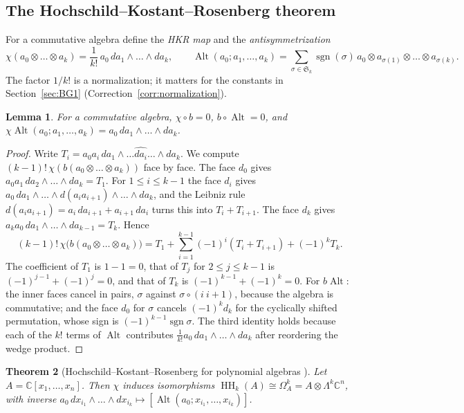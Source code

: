 \documentclass[11pt,oneside,reqno]{article}
\DeclareMathOperator{\HH}{HH}
\DeclareMathOperator{\sgn}{sgn}
\newcommand{\C}{\mathbb C}
\newcommand{\Om}{\Omega}
\theoremstyle{plain}
\newtheorem{theorem}{Theorem}[section]
\newtheorem{lemma}[theorem]{Lemma}
\theoremstyle{definition}
\theoremstyle{remark}
\begin{document}
\subsection{The Hochschild--Kostant--Rosenberg theorem}\label{subsec:HKR}
For a commutative algebra define the \emph{HKR map} and the
\emph{antisymmetrization}
\begin{equation}\label{eq:HKR}
 \chi(a_0\otimes\dots\otimes a_k)=\frac1{k!}\,a_0\,da_1\wedge\dots\wedge da_k,
 \qquad
 \operatorname{Alt}(a_0;a_1,\dots,a_k)=\sum_{\sigma\in\mathfrak S_k}\sgn(\sigma)\,
 a_0\otimes a_{\sigma(1)}\otimes\dots\otimes a_{\sigma(k)} .
\end{equation}
The factor \(1/k!\) is a normalization; it matters for the constants in
Section~\ref{sec:BG1} (Correction~\ref{corr:normalization}).

\begin{lemma}\label{lem:chi}
For a commutative algebra, \(\chi\circ b=0\), \(b\circ\operatorname{Alt}=0\), and
\(\chi\operatorname{Alt}(a_0;a_1,\dots,a_k)=a_0\,da_1\wedge\dots\wedge da_k\).
\end{lemma}

\begin{proof}
Write \(T_i=a_0a_i\,da_1\wedge\dots\widehat{da_i}\dots\wedge da_k\). We
compute \((k-1)!\,\chi(b(a_0\otimes\dots\otimes a_k))\) face by face. The
face \(d_0\) gives \(a_0a_1\,da_2\wedge\dots\wedge da_k=T_1\). For
\(1\le i\le k-1\) the face \(d_i\) gives
\(a_0\,da_1\wedge\dots\wedge d(a_ia_{i+1})\wedge\dots\wedge da_k\), and the
Leibniz rule \(d(a_ia_{i+1})=a_i\,da_{i+1}+a_{i+1}\,da_i\) turns this into
\(T_i+T_{i+1}\). The face \(d_k\) gives \(a_ka_0\,da_1\wedge\dots\wedge
da_{k-1}=T_k\). Hence
\[
 (k-1)!\,\chi\bigl(b(a_0\otimes\dots\otimes a_k)\bigr)=T_1+\sum_{i=1}^{k-1}
 (-1)^i(T_i+T_{i+1})+(-1)^kT_k .
\]
The coefficient of \(T_1\) is \(1-1=0\), that of \(T_j\) for \(2\le j\le k-1\)
is \((-1)^{j-1}+(-1)^j=0\), and that of \(T_k\) is
\((-1)^{k-1}+(-1)^k=0\). For \(b\operatorname{Alt}\): the inner faces cancel in pairs,
\(\sigma\) against \(\sigma\circ(i\ i{+}1)\), because the algebra is
commutative; and the face \(d_0\) for \(\sigma\) cancels \((-1)^kd_k\) for the
cyclically shifted permutation, whose sign is \((-1)^{k-1}\sgn\sigma\). The
third identity holds because each of the \(k!\) terms of \(\operatorname{Alt}\)
contributes \(\frac1{k!}a_0\,da_1\wedge\dots\wedge da_k\) after reordering
the wedge product.
\end{proof}

\begin{theorem}[Hochschild--Kostant--Rosenberg for polynomial algebras \cite{HKR}]
\label{thm:HKRpoly}
Let \(A=\C[x_1,\dots,x_n]\). Then \(\chi\) induces isomorphisms
\(\HH_k(A)\cong\Om^k_A=A\otimes\Lambda^k\C^n\), with inverse
\(a_0\,dx_{i_1}\wedge\dots\wedge dx_{i_k}\mapsto[\operatorname{Alt}(a_0;x_{i_1},\dots,x_{i_k})]\).
\end{theorem}
\end{document}
